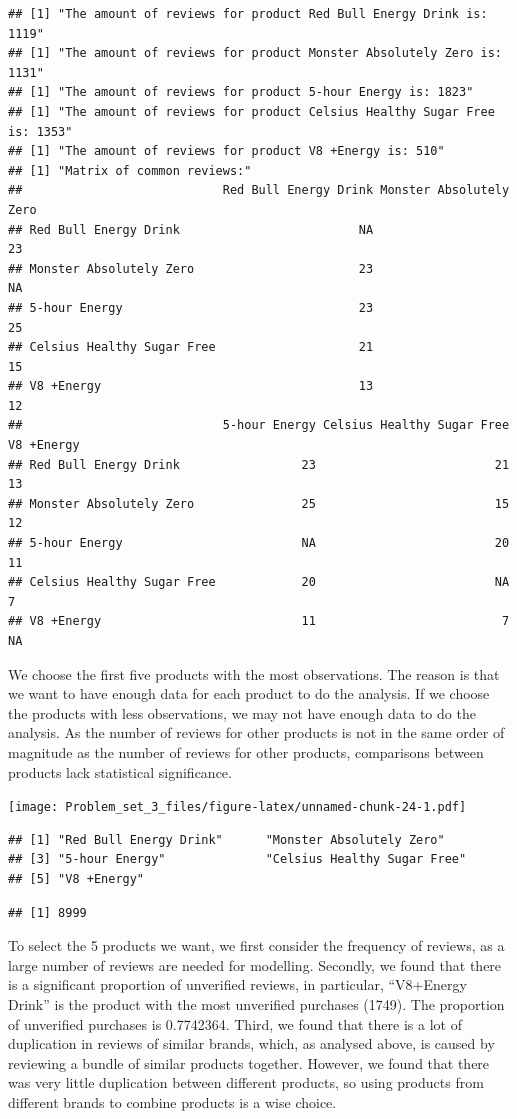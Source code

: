 \documentclass[
]{article}
\begin{document}
\begin{verbatim}
## [1] "The amount of reviews for product Red Bull Energy Drink is: 1119"
## [1] "The amount of reviews for product Monster Absolutely Zero is: 1131"
## [1] "The amount of reviews for product 5-hour Energy is: 1823"
## [1] "The amount of reviews for product Celsius Healthy Sugar Free is: 1353"
## [1] "The amount of reviews for product V8 +Energy is: 510"
## [1] "Matrix of common reviews:"
##                            Red Bull Energy Drink Monster Absolutely Zero
## Red Bull Energy Drink                         NA                      23
## Monster Absolutely Zero                       23                      NA
## 5-hour Energy                                 23                      25
## Celsius Healthy Sugar Free                    21                      15
## V8 +Energy                                    13                      12
##                            5-hour Energy Celsius Healthy Sugar Free V8 +Energy
## Red Bull Energy Drink                 23                         21         13
## Monster Absolutely Zero               25                         15         12
## 5-hour Energy                         NA                         20         11
## Celsius Healthy Sugar Free            20                         NA          7
## V8 +Energy                            11                          7         NA
\end{verbatim}

We choose the first five products with the most observations. The reason
is that we want to have enough data for each product to do the analysis.
If we choose the products with less observations, we may not have enough
data to do the analysis. As the number of reviews for other products is
not in the same order of magnitude as the number of reviews for other
products, comparisons between products lack statistical significance.

\texttt{[image: Problem\_set\_3\_files/figure-latex/unnamed-chunk-24-1.pdf]}

\begin{verbatim}
## [1] "Red Bull Energy Drink"      "Monster Absolutely Zero"   
## [3] "5-hour Energy"              "Celsius Healthy Sugar Free"
## [5] "V8 +Energy"
\end{verbatim}

\begin{verbatim}
## [1] 8999
\end{verbatim}

To select the 5 products we want, we first consider the frequency of
reviews, as a large number of reviews are needed for modelling.
Secondly, we found that there is a significant proportion of unverified
reviews, in particular, ``V8+Energy Drink'' is the product with the most
unverified purchases (1749). The proportion of unverified purchases is
0.7742364. Third, we found that there is a lot of duplication in reviews
of similar brands, which, as analysed above, is caused by reviewing a
bundle of similar products together. However, we found that there was
very little duplication between different products, so using products
from different brands to combine products is a wise choice.
\end{document}
